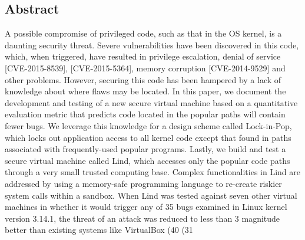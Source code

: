 \subsection*{Abstract}
A possible compromise of privileged code, such as that in the OS kernel, is a
daunting security threat. Severe vulnerabilities have been discovered in this
code, which, when triggered, have resulted in privilege escalation,
denial of service [CVE-2015-8539], [CVE-2015-5364], memory corruption
 [CVE-2014-9529] and other problems. However, securing this code has been hampered
  by a lack of knowledge about where flaws may be located. In this paper, we
 document the development and testing of a new secure virtual
 machine based on a quantitative evaluation metric that predicts code located
  in the popular paths will contain fewer bugs. We leverage this knowledge
  for a design scheme called  Lock-in-Pop, which locks out application access
 to all kernel code except that found in paths associated with frequently-used
 popular programs. Lastly, we build and test a secure virtual machine called Lind,
  which accesses only the popular code paths through a very small trusted computing
   base. Complex functionalities in Lind are addressed by using a memory-safe
    programming language to re-create riskier system calls within a sandbox.
  When Lind was tested against seven other virtual machines in whether it would
   trigger any of 35 bugs examined in Linux kernel version 3.14.1, the threat of
    an attack was reduced to less than 3%
    magnitude better than existing systems like VirtualBox (40%
     (31%
